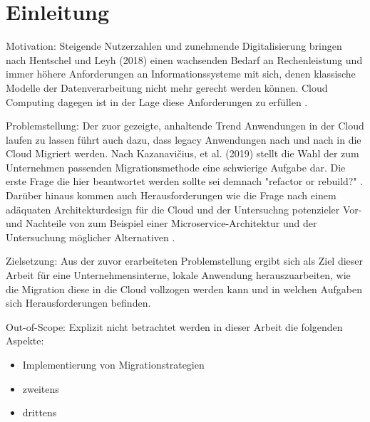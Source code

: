 
\chapter{Einleitung}


Motivation:
Steigende Nutzerzahlen und zunehmende Digitalisierung bringen nach Hentschel und Leyh (2018) einen wachsenden Bedarf an
Rechenleistung und immer höhere Anforderungen an Informationssysteme mit sich, denen klassische Modelle der Datenverarbeitung
nicht mehr gerecht werden können. Cloud Computing dagegen ist in der Lage diese Anforderungen zu erfüllen
\cite[Vgl.][S. 6]{Reinheimer2018}.

Problemstellung:
Der zuor gezeigte, anhaltende Trend Anwendungen in der Cloud laufen zu lassen führt auch dazu,
dass legacy Anwendungen nach und nach in die Cloud Migriert werden.
Nach Kazanavičius, et al. (2019) stellt die Wahl der zum Unternehmen passenden Migrationsmethode
eine schwierige Aufgabe dar. Die erste Frage die hier beantwortet werden sollte sei demnach
"refactor or rebuild?" \cite[Vgl.][S. 4]{Kazanavicius2019}.
Darüber hinaus kommen auch Herausforderungen wie die Frage nach einem adäquaten Architekturdesign
für die Cloud \cite[Vgl.][S. 14]{Pahl} und der Untersuchng potenzieler Vor- und Nachteile
von zum Beispiel einer Microservice-Architektur und der Untersuchung möglicher Alternativen
\cite[Vgl.][S. 3]{Carrasco2018}.

Zielsetzung:
Aus der zuvor erarbeiteten Problemstellung ergibt sich als Ziel dieser Arbeit für
eine Unternehmensinterne, lokale Anwendung herauszuarbeiten, wie die Migration diese in die
Cloud vollzogen werden kann und in welchen Aufgaben sich Herausforderungen befinden.

Out-of-Scope:
Explizit nicht betrachtet werden in dieser Arbeit die folgenden Aspekte:
\begin{itemize}
\item Implementierung von Migrationstrategien
\item zweitens
\item drittens
\end{itemize}



